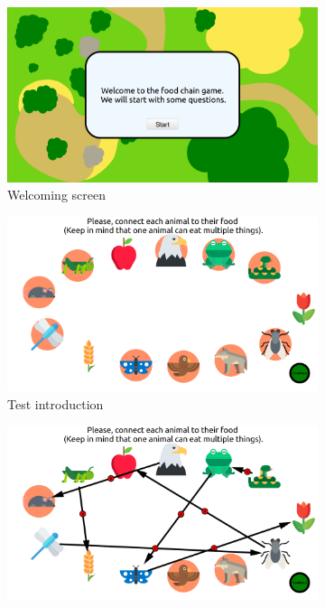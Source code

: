 \begin{figure}[ht]
	\centering
	\begin{subfigure}[b]{0.325\textwidth}
		\centering
		\includegraphics[width=\textwidth]{game_sequence/intro.png}
		\caption{Welcoming screen}
		\label{fig:tuto_welcome}
	\end{subfigure}
	\centering
	\begin{subfigure}[b]{0.325\textwidth}
		\centering
		\includegraphics[width=\textwidth]{game_sequence/pretest.png}
		\caption{Test introduction}
		\label{fig:tuto_pretest}
	\end{subfigure}
	\centering
	\begin{subfigure}[b]{0.325\textwidth}
		\centering
		\includegraphics[width=\textwidth]{game_sequence/test_partial.png}

\end{subfigure}
\end{figure}
